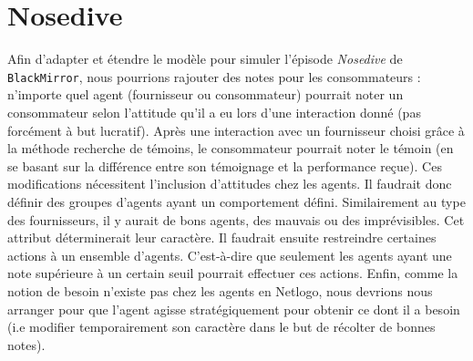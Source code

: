 \section{Nosedive}
Afin d'adapter et étendre le modèle pour simuler l'épisode \textit{Nosedive} de \texttt{BlackMirror}, nous pourrions rajouter des notes pour les consommateurs : n'importe quel agent (fournisseur ou consommateur) pourrait noter un consommateur selon l'attitude qu'il a eu lors d'une interaction donné (pas forcément à but lucratif). Après une interaction avec un fournisseur choisi grâce à la méthode recherche de témoins, le consommateur pourrait noter le témoin (en se basant sur la différence entre son témoignage et la performance reçue). Ces modifications nécessitent l'inclusion d'attitudes chez les agents. Il faudrait donc définir des groupes d'agents ayant un comportement défini. Similairement au type des fournisseurs, il y aurait de bons agents, des mauvais ou des imprévisibles. Cet attribut déterminerait leur caractère. 
Il faudrait ensuite restreindre certaines actions à un ensemble d'agents. C'est-à-dire que seulement les agents ayant une note supérieure à un certain seuil pourrait effectuer ces actions. 
Enfin, comme la notion de besoin n'existe pas chez les agents en Netlogo, nous devrions nous arranger pour que l'agent agisse stratégiquement pour obtenir ce dont il a besoin (i.e modifier temporairement son caractère dans le but de récolter de bonnes notes).  
